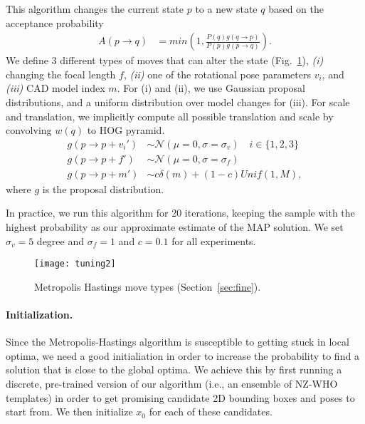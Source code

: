 This algorithm changes the current state $p$ to a new state $q$ based
on the acceptance probability
\begin{align}
    A(p \rightarrow q) & =  min\left( 1,  \frac{P(q) g(q \rightarrow p)}{P(p) g(p \rightarrow q)}\right).
\end{align}
We define $3$ different types of moves that can alter the state
(Fig.~\ref{fig:moves}), {\em (i)} changing the focal length $f$, {\em
(ii)} one of the rotational pose parameters $v_i$, and {\em (iii)} CAD model
index $m$. For (i) and (ii), we use Gaussian proposal distributions, and a uniform
distribution over model changes for (iii). For scale and translation, we
implicitly compute all possible translation and scale by convolving $w(q)$ to
HOG pyramid.
\begin{align}
    g(p \rightarrow p + v_i') & \sim \mathcal{N}(\mu = 0,\sigma = \sigma_v) \quad i \in \{1,2,3\}\\
    g(p \rightarrow p + f') & \sim \mathcal{N}(\mu = 0,\sigma = \sigma_f)\\
    g(p \rightarrow p + m') & \sim c \delta(m) + (1-c) Unif(1,M),
\end{align}
where $g$ is the proposal distribution. %
%

In practice, we run this algorithm for 20 iterations, keeping
the sample with the highest probability as our approximate estimate of
the MAP solution. We set $\sigma_v = 5$ degree and $\sigma_f = 1$ and
$c = 0.1$ for all experiments.

\begin{figure}[t]
\centering
    \texttt{[image: tuning2]} \\ [-5pt]
    \caption{Metropolis Hastings move types (Section~\ref{sec:fine}).}
 \label{fig:moves}
\end{figure}


\paragraph{Initialization.}
Since the Metropolis-Hastings algorithm is susceptible to getting
stuck in local optima, we need a good initialiation in order to
increase the probability to find a solution that is close to the
global optima. We achieve this by first running a discrete,
pre-trained version of our algorithm (i.e., an ensemble of NZ-WHO
templates) in order to get promising candidate 2D bounding boxes and
poses to start from. We then initialize $x_0$ for each of these candidates.
